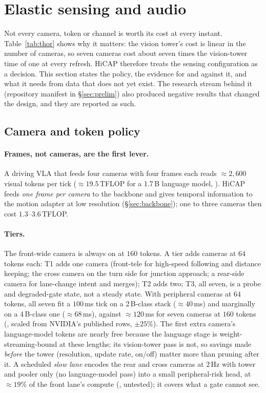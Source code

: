 \section{Elastic sensing and audio}\label{sec:elastic}
Not every camera, token or channel is worth its cost at every instant. Table~\ref{tab:thor} shows why it matters: the vision tower's cost is linear in the number of cameras, so seven cameras cost about seven times the
vision-tower time of one at every refresh. HiCAP therefore treats the sensing configuration as a decision. This section states the policy, the evidence for and against it, and what it needs from data that does not yet exist.
The research stream behind it (repository manifest in \S\ref{sec:prelim}) also produced negative results that changed the design, and they are reported as such.

\subsection{Camera and token policy}
\paragraph{Frames, not cameras, are the first lever.}
A driving VLA that feeds four cameras with four frames each reads $\approx2{,}600$ visual tokens per tick ($\approx19.5$\,TFLOP for a 1.7\,B language model, \evE). HiCAP feeds \emph{one frame per camera} to the backbone and gives temporal information to the motion adapter at low resolution (\S\ref{sec:backbone}); one to three cameras then cost $1.3$--$3.6$\,TFLOP.
\paragraph{Tiers.}
The front-wide camera is always on at $160$ tokens. A tier adds cameras at $64$ tokens each: T1 adds one camera (front-tele for high-speed following and distance keeping; the cross camera on the turn side for junction approach; a rear-side camera for lane-change intent and merges);
T2 adds two; T3, all seven, is a probe and degraded-gate state, not a steady state. With peripheral cameras at $64$ tokens, all seven fit a $100$\,ms tick on a 2\,B-class stack ($\approx40$\,ms) and marginally on a 4\,B-class one ($\approx68$\,ms), against $\approx120$\,ms for seven cameras at $160$ tokens (\evE, scaled from NVIDIA's published rows, $\pm25\%$).
The first extra camera's language-model tokens are nearly free because the language stage is weight-streaming-bound at these lengths; its vision-tower pass is not, so savings made \emph{before} the tower (resolution, update rate, on/off) matter more than pruning after it.
A scheduled \emph{slow lane} encodes the rear and cross cameras at $2$\,Hz with tower and pooler only (no language-model pass) into a small peripheral-risk head, at $\approx19\%$ of the front lane's compute (\evH, untested); it covers what a gate cannot see.


